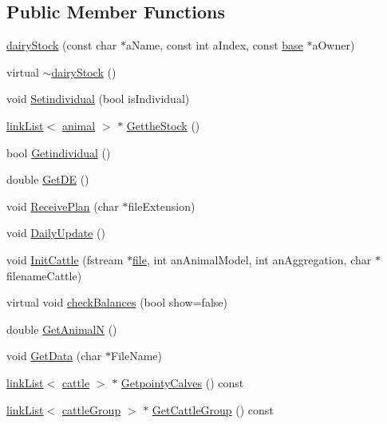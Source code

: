 \subsection*{Public Member Functions}
\begin{DoxyCompactItemize}
\item 
\hyperlink{classdairy_stock_aad9f7ae81dd17f7c347fcafbcfc94dda}{dairyStock} (const char $\ast$aName, const int aIndex, const \hyperlink{classbase}{base} $\ast$aOwner)
\item 
virtual \hyperlink{classdairy_stock_a9fe818e95a63fe96cc6f3b6da29c52cc}{$\sim$dairyStock} ()
\item 
void \hyperlink{classdairy_stock_a815b14e99987eef68185b0380086c1d2}{Setindividual} (bool isIndividual)
\item 
\hyperlink{classlink_list}{linkList}$<$ \hyperlink{classanimal}{animal} $>$ $\ast$ \hyperlink{classdairy_stock_af2ccb2b39af72516a6b917c13db1e7cd}{GettheStock} ()
\item 
bool \hyperlink{classdairy_stock_a61d3ed76c3e663bf7da37257bc6a3ff3}{Getindividual} ()
\item 
double \hyperlink{classdairy_stock_aad94cb740f4ee70763adede5f4c4844c}{GetDE} ()
\item 
void \hyperlink{classdairy_stock_aa06e97a86fe280ee6b23ea2985317b65}{ReceivePlan} (char $\ast$fileExtension)
\item 
void \hyperlink{classdairy_stock_a6650864514247ac49a701d3e40cdad9a}{DailyUpdate} ()
\item 
void \hyperlink{classdairy_stock_a12912676a0472206a16c98bbba037887}{InitCattle} (fstream $\ast$\hyperlink{classbase_a3af52ee9891719d09b8b19b42450b6f6}{file}, int anAnimalModel, int anAggregation, char $\ast$filenameCattle)
\item 
virtual void \hyperlink{classdairy_stock_a5bc23504c268f65736035b37b94af54a}{checkBalances} (bool show=false)
\item 
double \hyperlink{classdairy_stock_a15856795254b0a1e9d5fb82925647899}{GetAnimalN} ()
\item 
void \hyperlink{classdairy_stock_ac675c0d6567e2a68d63b5e63dd9cf5a2}{GetData} (char $\ast$FileName)
\item 
\hyperlink{classlink_list}{linkList}$<$ \hyperlink{classcattle}{cattle} $>$ $\ast$ \hyperlink{classdairy_stock_a58e319d3fd9eb8d586d9e2b85279f379}{GetpointyCalves} () const 
\item 
\hyperlink{classlink_list}{linkList}$<$ \hyperlink{classcattle_group}{cattleGroup} $>$ $\ast$ \hyperlink{classdairy_stock_aa0df5d9ea7cd74dd41369e4830548fb8}{GetCattleGroup} () const 

\end{DoxyCompactItemize}
